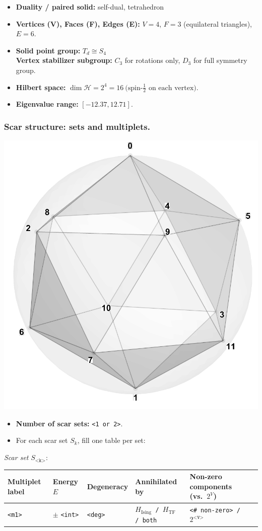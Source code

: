 \documentclass[11pt,a4paper]{article}
\newcommand{\Hising}{H_{\mathrm{Ising}}}
\newcommand{\Htf}{H_{\mathrm{TF}}}
\begin{document}
\begin{itemize}[leftmargin=1.5em]
  \item \textbf{Duality / paired solid:} self-dual, tetrahedron
  \item \textbf{Vertices (V), Faces (F), Edges (E):} $V = 4$,\; $F = 3$ (equilateral triangles),\; $E = 6$.
  \item \textbf{Solid point group:} $T_d \cong S_4$\\
        \textbf{Vertex stabilizer subgroup:} $C_3$ for rotations only, $D_3$ for full symmetry group.
  \item \textbf{Hilbert space:} \(
        \dim\mathcal{H} = 2^{4} = 16\ \text{(spin-$\tfrac12$ on each vertex).}
        \)
  \item \textbf{Eigenvalue range:} $[-12.37, 12.71]$.
\end{itemize}

\subsubsection*{Scar structure: sets and multiplets.}
\begin{center}
  \includegraphics[width=.6\linewidth]{icosahedron}
\end{center}

\begin{itemize}[leftmargin=1.5em]
  \item \textbf{Number of scar sets:} \texttt{<1 or 2>}. 
  \item For each scar set $S_k$, fill one table per set:
\end{itemize}

\noindent\textit{Scar set} $S_{\texttt{<k>}}$:  
\begin{center}
\begin{tabular}{L{3.5cm} C{2.2cm} C{2.2cm} C{2.2cm} C{3.0cm} C{3.2cm}}
\toprule
\textbf{Multiplet label} & \textbf{Energy $E$} & \textbf{Degeneracy} & \textbf{Annihilated by} & \textbf{Non-zero components (vs.\ $2^{V}$)} \\
\midrule
\texttt{<m1>} & $\pm$ \texttt{<int>} & \texttt{<deg>} & \texttt{$\Hising$ / $\Htf$ / both} & \texttt{<\# non-zero> / $2^{\texttt{<V>}}$} \\
\bottomrule
\end{tabular}
\end{center}
\end{document}
